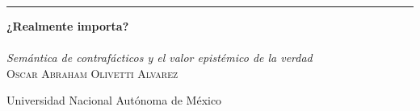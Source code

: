 
\begin{titlepage} %

	\raggedleft %

	\rule{1pt}{\textheight} %
	\hspace{0.04\textwidth} %
	\parbox[b]{0.85\textwidth}{ %

	{\Huge\bfseries ¿Realmente importa? \\[0.3\baselineskip]}\\[1\baselineskip] %
	\large{\emph{Semántica de contrafácticos y el valor epistémico de la verdad}}\\[4\baselineskip] %
	{\Large\textsc{Oscar Abraham Olivetti Alvarez}} %


	\vspace{0.5\textheight} %

	{\noindent Universidad Nacional Autónoma de México~~\plogo}\\[\baselineskip] %
	}

\end{titlepage}

